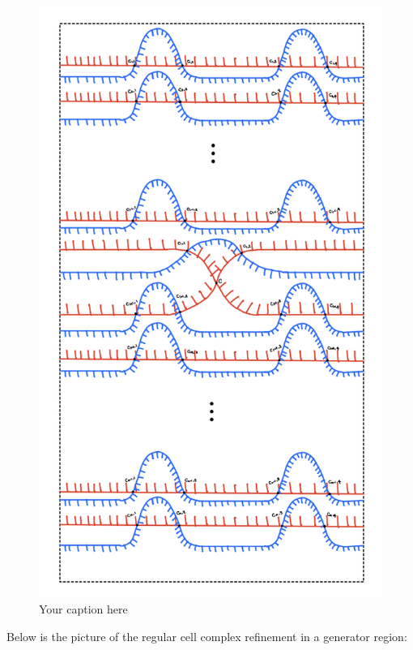 \begin{definition}
\begin{figure}[H] 
    \centering
    \includegraphics[scale = 0.95]{diagrams/local_systems_on_as_diagrams/2-2.png} 
    \caption{Your caption here}
    \label{fig:your-label}
\end{figure}

Below is the picture of the regular cell complex refinement in a generator region:


\end{definition}

